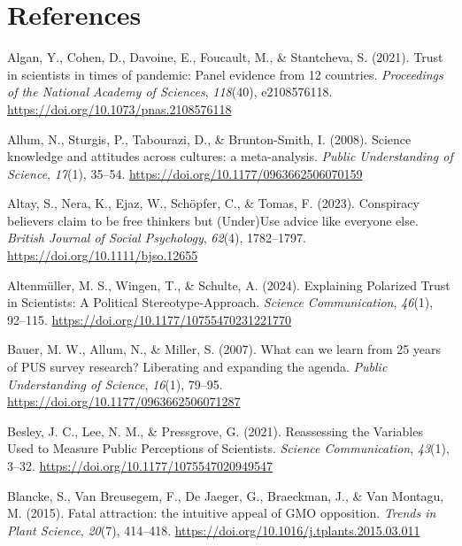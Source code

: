 \documentclass[
  doc,floatsintext]{apa6}
\newlength{\cslhangindent}
\newenvironment{CSLReferences}[2] %
 {\begin{list}{}{%
  \setlength{\itemindent}{0pt}
  \setlength{\leftmargin}{0pt}
  \setlength{\parsep}{0pt}
  \ifodd #1
   \setlength{\leftmargin}{\cslhangindent}
   \setlength{\itemindent}{-1\cslhangindent}
  \fi
  \setlength{\itemsep}{#2\baselineskip}}}
 {\end{list}}
\begin{document}
\FloatBarrier

\section{References}\label{references}

\label{refs}
\begin{CSLReferences}{1}{0}
Algan, Y., Cohen, D., Davoine, E., Foucault, M., \& Stantcheva, S. (2021). Trust in scientists in times of pandemic: Panel evidence from 12 countries. \emph{Proceedings of the National Academy of Sciences}, \emph{118}(40), e2108576118. \url{https://doi.org/10.1073/pnas.2108576118}

Allum, N., Sturgis, P., Tabourazi, D., \& Brunton-Smith, I. (2008). Science knowledge and attitudes across cultures: a meta-analysis. \emph{Public Understanding of Science}, \emph{17}(1), 35--54. \url{https://doi.org/10.1177/0963662506070159}

Altay, S., Nera, K., Ejaz, W., Schöpfer, C., \& Tomas, F. (2023). Conspiracy believers claim to be free thinkers but (Under)Use advice like everyone else. \emph{British Journal of Social Psychology}, \emph{62}(4), 1782--1797. \url{https://doi.org/10.1111/bjso.12655}

Altenmüller, M. S., Wingen, T., \& Schulte, A. (2024). Explaining Polarized Trust in Scientists: A Political Stereotype-Approach. \emph{Science Communication}, \emph{46}(1), 92--115. \url{https://doi.org/10.1177/10755470231221770}

Bauer, M. W., Allum, N., \& Miller, S. (2007). What can we learn from 25 years of PUS survey research? Liberating and expanding the agenda. \emph{Public Understanding of Science}, \emph{16}(1), 79--95. \url{https://doi.org/10.1177/0963662506071287}

Besley, J. C., Lee, N. M., \& Pressgrove, G. (2021). Reassessing the Variables Used to Measure Public Perceptions of Scientists. \emph{Science Communication}, \emph{43}(1), 3--32. \url{https://doi.org/10.1177/1075547020949547}

Blancke, S., Van Breusegem, F., De Jaeger, G., Braeckman, J., \& Van Montagu, M. (2015). Fatal attraction: the intuitive appeal of GMO opposition. \emph{Trends in Plant Science}, \emph{20}(7), 414--418. \url{https://doi.org/10.1016/j.tplants.2015.03.011}


\end{CSLReferences}
\end{document}
